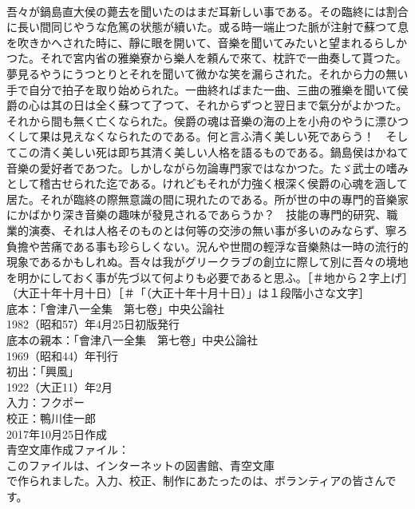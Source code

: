 \documentclass[8pt]{extreport}
\begin{document}
\begin{CJK}{UTF8}{min}
\\	吾々が鍋島直大侯の薨去を聞いたのはまだ耳新しい事である。その臨終には割合に長い間同じやうな危篤の状態が續いた。或る時一端止つた脈が注射で蘇つて息を吹きかへされた時に、靜に眼を開いて、音樂を聞いてみたいと望まれるらしかつた。それで宮内省の雅樂寮から樂人を頼んで來て、枕許で一曲奏して貰つた。夢見るやうにうつとりとそれを聞いて微かな笑を漏らされた。それから力の無い手で自分で拍子を取り始められた。一曲終ればまた一曲、三曲の雅樂を聞いて侯爵の心は其の日は全く蘇つて了つて、それからずつと翌日まで氣分がよかつた。それから間も無く亡くなられた。侯爵の魂は音樂の海の上を小舟のやうに漂ひつくして果は見えなくなられたのである。何と言ふ清く美しい死であらう！　そしてこの清く美しい死は即ち其清く美しい人格を語るものである。鍋島侯はかねて音樂の愛好者であつた。しかしながら勿論專門家ではなかつた。たゞ武士の嗜みとして稽古せられた迄である。けれどもそれが力強く根深く侯爵の心魂を涵して居た。それが臨終の際無意識の間に現れたのである。所が世の中の專門的音樂家にかばかり深き音樂の趣味が發見されるであらうか？　技能の專門的研究、職業的演奏、それは人格そのものとは何等の交渉の無い事が多いのみならず、寧ろ負擔や苦痛である事も珍らしくない。況んや世間の輕浮な音樂熱は一時の流行的現象であるかもしれぬ。吾々は我がグリークラブの創立に際して別に吾々の境地を明かにしておく事が先づ以て何よりも必要であると思ふ。［＃地から２字上げ］（大正十年十月十日）［＃「（大正十年十月十日）」は１段階小さな文字］
\\	底本：「會津八一全集　第七卷」中央公論社
\\	1982（昭和57）年4月25日初版発行
\\	底本の親本：「會津八一全集　第七卷」中央公論社
\\	1969（昭和44）年刊行
\\	初出：「興風」
\\	1922（大正11）年2月
\\	入力：フクポー
\\	校正：鴨川佳一郎
\\	2017年10月25日作成
\\	青空文庫作成ファイル：
\\	このファイルは、インターネットの図書館、青空文庫
\\	で作られました。入力、校正、制作にあたったのは、ボランティアの皆さんです。
\end{CJK}
\end{document}
